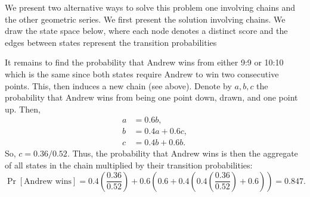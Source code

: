 \begin{solution}
    We present two alternative ways to solve this problem one involving chains and the other geometric series. We first present the solution involving chains. We draw the state space below, where each node denotes a distinct score and the edges between states represent the transition probabilities
    \begin{center}
        \qquad\qquad
    \end{center}
    It remains to find the probability that Andrew wins from either 9:9 or 10:10 which is the same since both states require Andrew to win two consecutive points. This, then induces a new chain (see above). Denote by $a,b,c$ the probability that Andrew wins from being one point down, drawn, and one point up. Then, 
    \begin{align*}
        a &= 0.6b, \\
        b &= 0.4a + 0.6c, \\
        c &= 0.4b + 0.6b.
    \end{align*}
    So, $c = 0.36/0.52$. Thus, the probability that Andrew wins is then the aggregate of all states in the chain multiplied by their transition probabilities:
    \[
        \Pr[\text{Andrew wins}] = 0.4\left(\frac{0.36}{0.52}\right) + 0.6\left(0.6 + 0.4\left(0.4\left(\frac{0.36}{0.52}\right) + 0.6\right)\right) = 0.847.  
    \]
\end{solution}
